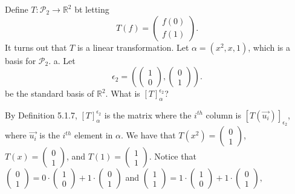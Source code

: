 \documentclass[12pt]{article}
\newenvironment{problem}[2][Problem]
{
	\begin{trivlist} 
		\item[\hskip \labelsep {\bfseries #1 #2:}]
	}
{
	\end{trivlist}
	}
\newenvironment{solution}[1][Solution]
{
	\begin{trivlist} 
		\item[\hskip \labelsep {\itshape #1:}]
	}
	{
	\end{trivlist}
}
\begin{document}
\begin{problem}{1}
Define $T:\mathcal{P}_2 \to \mathbb{R}^2$ bt letting
\[
T(f)=\begin{pmatrix} f(0)\\f(1) \end{pmatrix} \text{.}
\]
It turns out that $T$ is a linear transformation. Let $\alpha = (x^2,x,1)$, which is a basis for $\mathcal{P}_2$.
\noindent
\newline
\newline
a. Let
\[
\epsilon _2 = \left( \begin{pmatrix} 1\\0 \end{pmatrix}, \begin{pmatrix} 0\\1 \end{pmatrix} \right) \text{.}
\]
be the standard basis of $\mathbb{R}^2$. What is $[T]_\alpha ^{\epsilon_2}$?
\begin{solution}
By Definition 5.1.7, $[T]_\alpha ^{\epsilon_2}$ is the matrix where the $i^{th}$ column is $[T(\vec{u_i})]_{\epsilon_2}$, where $\vec{u_i}$ is the $i^{th}$ element in $\alpha$. We have that
$T(x^2)=\begin{pmatrix}0\\1\end{pmatrix}$, 
$T(x)=\begin{pmatrix}0\\1\end{pmatrix}$, and
$T(1)=\begin{pmatrix}1\\1\end{pmatrix} \text{.}$
Notice that
$\begin{pmatrix}0\\1\end{pmatrix} = 0 \cdot \begin{pmatrix}1\\0\end{pmatrix} + 1\cdot \begin{pmatrix}0\\1\end{pmatrix}$ and 
$\begin{pmatrix}1\\1\end{pmatrix} = 1 \cdot \begin{pmatrix}1\\0\end{pmatrix} + 1\cdot \begin{pmatrix}0\\1\end{pmatrix} \text{,}$

\end{solution}
\end{problem}
\end{document}
